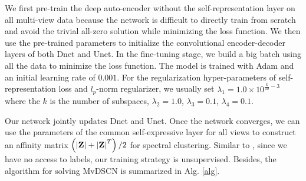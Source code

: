 \documentclass[journal]{IEEEtran}
\begin{document}
We first pre-train the deep auto-encoder without the self-representation layer on all multi-view data because the network is difficult to directly train from scratch and avoid the trivial all-zero solution while minimizing the loss function.
We then use the pre-trained parameters to initialize the convolutional encoder-decoder layers of both Dnet and Unet.
In the fine-tuning stage, we build a big batch using all the data to minimize the loss function.
The model is trained with Adam \cite{Kingma2015AdamAM} and an initial learning rate of $0.001$.
For the regularization hyper-parameters of self-representation loss and $l_p$-norm regularizer, we usually set $\lambda_1 = 1.0 \times 10^{\frac{k}{10} - 3}$ where the $k$ is the number of subspaces, $\lambda_2 = 1.0$, $\lambda_3 = 0.1$, $\lambda_4 = 0.1$.



Our network jointly updates Dnet and Unet.
Once the network converges, we can use the parameters of the common self-expressive layer for all views to construct an affinity matrix $\left( {\left| {\bf{Z}} \right| + {{\left| {\bf{Z}} \right|}^T}} \right)/2$ for spectral clustering.
Similar to \cite{ji2017deep}, since we have no access to labels, our training strategy is unsupervised.
Besides, the algorithm for solving MvDSCN is summarized in Alg. \ref{alg}.
\end{document}
